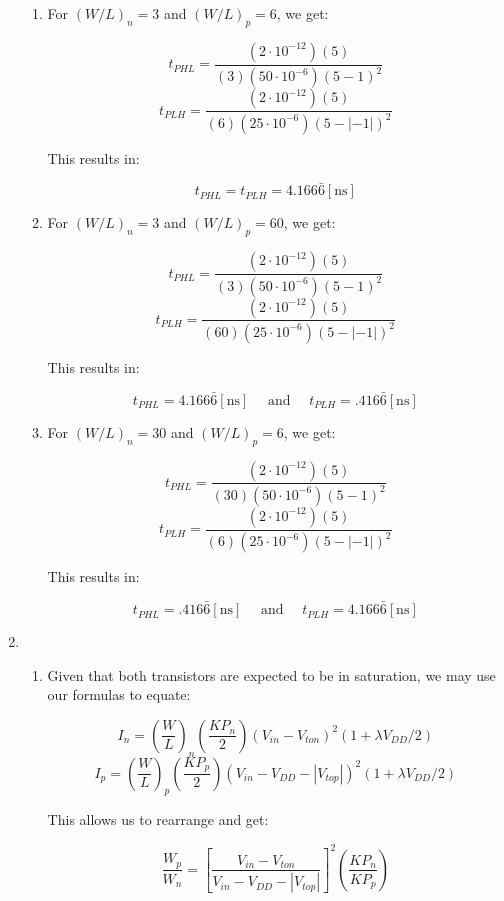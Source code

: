 \begin{enumerate}
    \begin{enumerate}

      \item For $(W/L)_n=3$ and $(W/L)_p=6$, we get:

        $$t_{PHL}=\frac{(2\cdot10^{-12})(5)}{(3)(50\cdot10^{-6})(5-1)^2}$$
        $$t_{PLH}=\frac{(2\cdot10^{-12})(5)}{(6)(25\cdot10^{-6})(5-|-1|)^2}$$

        This results in:

        $$\boxed{t_{PHL}=t_{PLH}=4.166\bar{6}[\si{\nano\second}]}$$

      \item For $(W/L)_n=3$ and $(W/L)_p=60$, we get:

        $$t_{PHL}=\frac{(2\cdot10^{-12})(5)}{(3)(50\cdot10^{-6})(5-1)^2}$$
        $$t_{PLH}=\frac{(2\cdot10^{-12})(5)}{(60)(25\cdot10^{-6})(5-|-1|)^2}$$

        This results in:

        $$\boxed{t_{PHL}=4.166\bar{6}[\si{\nano\second}]\quad\text{ and }\quad t_{PLH}=.416\bar{6}[\si{\nano\second}]}$$

      \item For $(W/L)_n=30$ and $(W/L)_p=6$, we get:

        $$t_{PHL}=\frac{(2\cdot10^{-12})(5)}{(30)(50\cdot10^{-6})(5-1)^2}$$
        $$t_{PLH}=\frac{(2\cdot10^{-12})(5)}{(6)(25\cdot10^{-6})(5-|-1|)^2}$$

        This results in:

        $$\boxed{t_{PHL}=.416\bar{6}[\si{\nano\second}]\quad\text{ and }\quad t_{PLH}=4.166\bar{6}[\si{\nano\second}]}$$

    \end{enumerate}

  \item

    \begin{enumerate}

      \item Given that both transistors are expected to be in saturation, we may use our formulas to equate:

        $$I_n=\left( \frac{W}{L} \right)_n\left(\frac{KP_n}{2}\right)(V_{in}-V_{ton})^2(1+\lambda V_{DD}/2)$$
        $$I_p=\left( \frac{W}{L} \right)_p\left(\frac{KP_p}{2}\right)(V_{in}-V_{DD}-|V_{top}|)^2(1+\lambda V_{DD}/2)$$

        This allows us to rearrange and get:

        $$\frac{W_p}{W_n}=\left[ \frac{V_{in}-V_{ton}}{V_{in}-V_{DD}-|V_{top}|} \right]^2\left( \frac{KP_n}{KP_p} \right)$$


\end{enumerate}
\end{enumerate}
